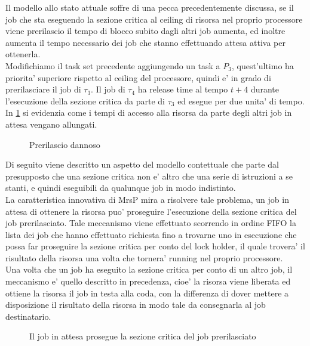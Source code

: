 \documentclass[a4paper,11pt]{article}
\begin{document}
\noindent Il modello allo stato attuale soffre di una pecca precedentemente discussa, se il job che sta eseguendo la sezione critica al ceiling di risorsa nel proprio processore viene prerilascio il tempo di blocco subito dagli altri job aumenta, ed inoltre aumenta il tempo necessario dei job che stanno effettuando attesa attiva per ottenerla.\\

\noindent Modifichiamo il task set precedente aggiungendo un task a $P_3$, quest'ultimo ha priorita' superiore rispetto al ceiling del processore, quindi e' in grado di prerilasciare il job di $\tau_3$. Il job di $\tau_4$ ha release time al tempo $t + 4$ durante l'esecuzione della sezione critica da parte di $\tau_3$ ed esegue per due unita' di tempo. In \ref{second} si evidenzia come i tempi di accesso alla risorsa da parte degli altri job in attesa vengano allungati.\\

\begin{figure}[t]
	\centering
	\ModelloConcettualeTwo
	\caption{Prerilascio dannoso}
	\label{second}
\end{figure}

\noindent Di seguito viene descritto un aspetto del modello contettuale che parte dal presupposto che una sezione critica non e' altro che una serie di istruzioni a se stanti, e quindi eseguibili da qualunque job in modo indistinto.\\

\noindent La caratteristica innovativa di MrsP mira a risolvere tale problema, un job in attesa di ottenere la risorsa puo' proseguire l'esecuzione della sezione critica del job prerilasciato. Tale meccanismo viene effettuato scorrendo in ordine FIFO la lista dei job che hanno effettuato richiesta fino a trovarne uno in esecuzione che possa far proseguire la sezione critica per conto del lock holder, il quale trovera' il risultato della risorsa una volta che tornera' running nel proprio processore.\\

\noindent Una volta che un job ha eseguito la sezione critica per conto di un altro job, il meccanismo e' quello descritto in precedenza, cioe' la risorsa viene liberata ed ottiene la risorsa il job in testa alla coda, con la differenza di dover mettere a disposizione il risultato della risorsa in modo tale da consegnarla al job destinatario.\\

\begin{figure}
	\centering
	\ModelloConcettualeThree
	\caption{Il job in attesa prosegue la sezione critica del job prerilasciato}
	\label{third}
\end{figure}
\end{document}
